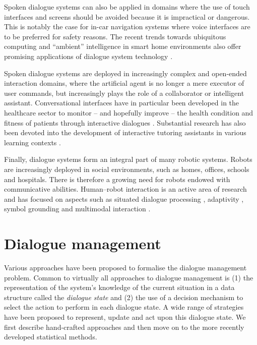 Spoken dialogue systems can also be applied in domains where the use of touch interfaces and screens should be avoided because it is impractical or dangerous.  This is notably the case for in-car navigation systems \citep{cumove,CastronovoMPM10} where voice interfaces are to be preferred for safety reasons.  The recent trends towards ubiquitous computing and ``ambient'' intelligence in smart home environments also offer promising applications of dialogue system technology \citep{vipperla2009a,ambient2010}.

Spoken dialogue systems are deployed in increasingly complex and open-ended interaction domains, where the artificial agent is no longer a mere executor of user commands, but increasingly plays the role of a collaborator or intelligent assistant.  Conversational interfaces have in particular been developed in the healthcare sector to monitor -- and hopefully improve -- the health condition and fitness of patients through interactive dialogues \citep{BickmoreG06,Stahl:2009,MorbiniFDSTR12}.  Substantial research has also been devoted into the development of interactive tutoring assistants in various learning contexts \citep{ChiVLJ11,Dzikovska:2011,jan2011,TraumAAFGKLNS12}. 

Finally, dialogue systems form an integral part of many robotic systems.  Robots are increasingly deployed in social environments, such as homes, offices, schools and hospitals.  There is therefore a growing need for robots endowed with communicative abilities. Human--robot interaction is an active area of research and has focused on aspects such as situated dialogue processing \citep{CantrellSSW10,cosybook:dialogue,Kruijff2012a}, adaptivity \citep{DoshiR08}, symbol grounding \citep{Roy05,lemaignan2012} and multimodal interaction \citep{stiefelhagen2004,salem2012,MirnigWSMGBGT13}.
 
\section{Dialogue management}
\label{sec:dm}

Various approaches have been proposed to formalise the dialogue management problem.  Common to virtually all approaches to dialogue management is (1) the representation of the system's knowledge of the current situation in a data structure called the \textit{dialogue state} and (2) the use of a decision mechanism to select the action to perform in each dialogue state. A wide range of strategies have been proposed to represent, update and act upon this dialogue state.  We first describe hand-crafted approaches and then move on to the more recently developed statistical methods. 

